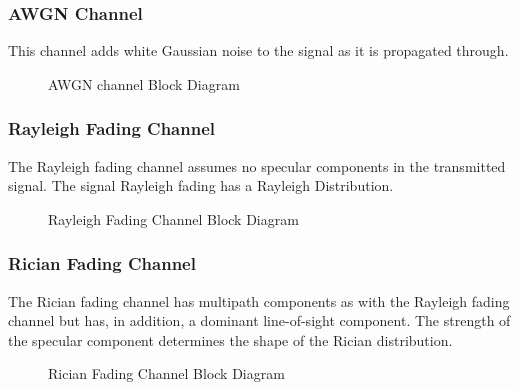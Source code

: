 \subsubsection{AWGN Channel}
This channel adds white Gaussian noise to the signal as it is propagated through. 
\begin{figure}[htpb!]
	\centerline{\resizebox{15cm}{!}{}}
	\caption{AWGN channel Block Diagram}
	\label{fig:ofdm_ch_awgn_meth}
\end{figure}

\subsubsection{Rayleigh Fading Channel}
The Rayleigh fading channel assumes no specular components in the transmitted signal. The signal Rayleigh fading has a Rayleigh Distribution.
\begin{figure}[htpb!]
	\centerline{\resizebox{15cm}{!}{}}
	\caption{Rayleigh Fading Channel Block Diagram}
	\label{fig:ofdm_ch_rayl_meth}
\end{figure}

\subsubsection{Rician Fading Channel}
The Rician fading channel has multipath components as with the Rayleigh fading channel but has, in addition, a dominant line-of-sight component. The strength of the specular component determines the shape of the Rician distribution. 
\begin{figure}[h!]
	\centerline{\resizebox{15cm}{!}{}}
	\caption{Rician Fading Channel Block Diagram}
	\label{fig:ofdm_ch_rice_meth}
\end{figure}



